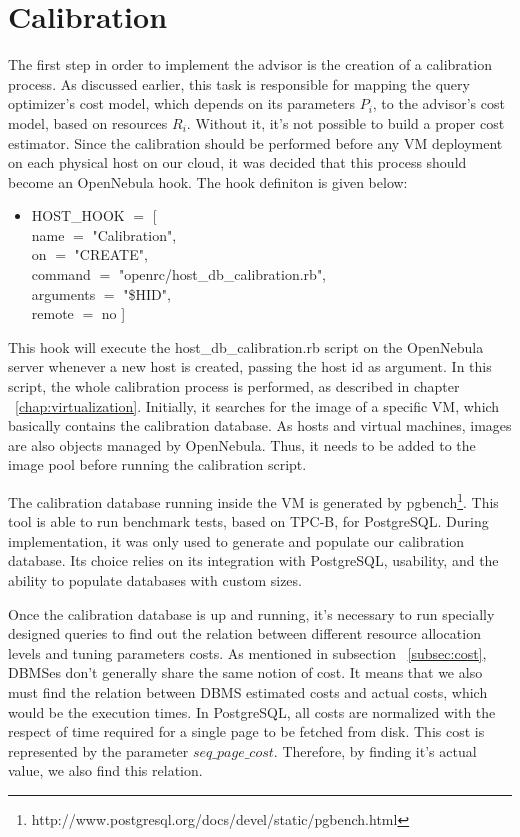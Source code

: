 \section{Calibration}
\label{sec:calib}

The first step in order to implement the advisor is the creation of a calibration process. As discussed earlier, this task is responsible for mapping the query optimizer's cost model, which depends on its parameters $P_{i}$, to  the advisor's cost model, based on resources $R_{i}$. Without it, it's not possible to build a proper cost estimator. Since the calibration should be performed before any VM deployment on each physical host on our cloud, it was decided that this process should become an OpenNebula hook. The hook definiton is given below:
\begin{itemize}
 \item HOST\_HOOK $=$ [ \\
    name      $=$ "Calibration",\\
    on        $=$ "CREATE",\\
    command   $=$ "openrc/host\_db\_calibration.rb",\\
    arguments $=$ "\$HID",\\
    remote    $=$ no ]\\
\end{itemize}

This hook will execute the host\_db\_calibration.rb script on the OpenNebula server whenever a new host is created, passing the host id as argument. In this script, the whole calibration process is performed, as described in chapter ~\ref{chap:virtualization}. Initially, it searches for the image of a specific VM, which basically contains the calibration database. As hosts and virtual machines, images are also objects managed by OpenNebula. Thus, it needs to be added to the image pool before running the calibration script.

The calibration database running inside the VM is generated by pgbench\footnote{http://www.postgresql.org/docs/devel/static/pgbench.html}. This tool is able to run benchmark tests, based on TPC-B, for PostgreSQL. During implementation, it was only used to generate and populate our calibration database. Its choice relies on its integration with PostgreSQL, usability, and the ability to populate databases with custom sizes.

Once the calibration database is up and running, it's necessary to run specially designed queries to find out the relation between different resource allocation levels and tuning parameters costs.  As mentioned in subsection ~\ref{subsec:cost}, DBMSes don't generally share the same notion of cost. It means that we also must find the relation between DBMS estimated costs and actual costs, which would be the execution times. In PostgreSQL, all costs are normalized with the respect of time required for a single page to be fetched from disk. This cost is represented by the parameter $seq\_page\_cost$. Therefore, by finding it's actual value, we also find this relation. 


